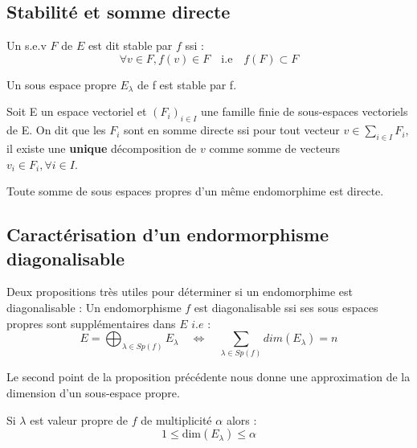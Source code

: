 \subsection{Stabilité et somme directe}

\begin{definition}
    Un s.e.v $F$ de $E$ est dit stable par $f$ ssi :
    \[ \forall v \in F, f(v) \in F \quad \text{i.e} \quad f(F) \subset F \]
\end{definition}

\begin{prop}
    Un sous espace propre $E_\lambda$ de f est stable par f. 
\end{prop}

\begin{definition}
    Soit E un espace vectoriel et $(F_i)_{i \in I}$ une famille finie de sous-espaces vectoriels de E. 
    On dit que les $F_i$ sont en somme directe ssi pour tout vecteur $v \in \sum_{i \in I} F_i$, il existe une \textbf{unique} 
    décomposition de $v$ comme somme de vecteurs $v_i \in F_i, \forall i \in I$. 
\end{definition}

\begin{prop}
    Toute somme de sous espaces propres d'un même endomorphime est directe. 
\end{prop}


\subsection{Caractérisation d'un endormorphisme diagonalisable}

\begin{proposition} Deux propositions très utiles pour déterminer si un endomorphime est diagonalisable : 
    Un endomorphisme $f$ est diagonalisable ssi ses sous espaces propres sont supplémentaires dans $E$ $i.e$ :
        \[ E = \bigoplus_{\lambda \in Sp(f)} E_\lambda \quad \iff \quad \sum_{\lambda \in Sp(f)} dim(E_\lambda) = n \]    
\end{proposition}

Le second point de la proposition précédente nous donne une approximation de la dimension d'un sous-espace propre. 

\begin{prop}
    Si $\lambda$ est valeur propre de $f$ de multiplicité $\alpha$ alors : $$ 1 \leq \text{dim} (E_\lambda) \leq \alpha $$ 
\end{prop}

